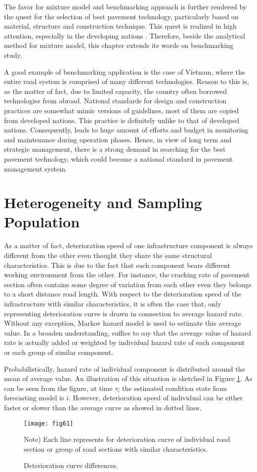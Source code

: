 The favor for mixture model and benchmarking approach is further rendered by the quest for the selection of best pavement technology, particularly based on material, structure and construction technique. This quest is realized in high attention, especially in the developing nations \cite{kcleong}. Therefore, beside the analytical method for mixture model, this chapter extends its words on benchmarking study. 

A good example of benchmarking application is the case of Vietnam, where the entire road system is comprised of many different technologies. Reason to this is, as the matter of fact, due to limited capacity, the country often borrowed technologies from abroad. National standards for design and construction practices are somewhat mimic versions of guidelines, most of them are copied from developed nations. This practice is definitely unlike to that of developed nations. Consequently, leads to huge amount of efforts and budget in monitoring and maintenance during operation phases. Hence, in view of long term and strategic management, there is a strong demand in searching for the best pavement technology, which could become a national standard in pavement management system. 

\section{Heterogeneity and Sampling Population}
\label{62}
As a matter of fact, deterioration speed of one infrastructure component is always different from the other even thought they share the same structural characteristics. This is due to the fact that each component bears different working environment from the other. For instance, the cracking rate of pavement section often contains some degree of variation from each other even they belongs to a short distance road length. With respect to the deterioration speed of the infrastructure with similar characteristics, it is often the case that, only representing deterioration curve is drawn in connection to average hazard rate. Without any exception, Markov hazard model is used to estimate this average value. In a broaden understanding, suffice to say that the average value of hazard rate is actually added or weighted by individual hazard rate of each component or each group of similar component. 

Probabilistically, hazard rate of individual component is distributed around the mean of average value. An illustration of this situation is sketched in Figure \ref{fig61}. As can be seen from the figure, at time $\tau_i$ the estimated condition state from forecasting model is $i$. However, deterioration speed of individual can be either faster or slower than the average curve as showed in dotted lines.
%
\begin{figure}[t]
\begin{center}
\texttt{[image: fig61]} 
\end{center}
\footnotesize Note) Each line represents for deterioration curve of individual road section or group of road sections with similar characteristics.
\caption{Deterioration curve differences.}
\label{fig61} 
\end{figure}
%
